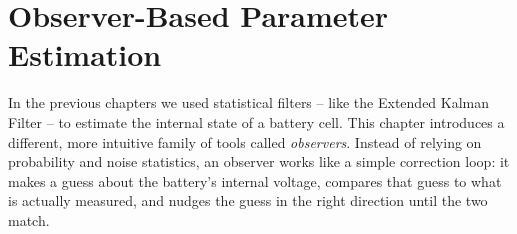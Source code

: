 ﻿%

\chapter{Observer-Based Parameter Estimation}
\label{ch:observer_parameter_estimation}

In the previous chapters we used statistical filters -- like the Extended Kalman Filter -- to estimate the internal state of a battery cell. This chapter introduces a different, more intuitive family of tools called \emph{observers}. Instead of relying on probability and noise statistics, an observer works like a simple correction loop: it makes a guess about the battery's internal voltage, compares that guess to what is actually measured, and nudges the guess in the right direction until the two match.

